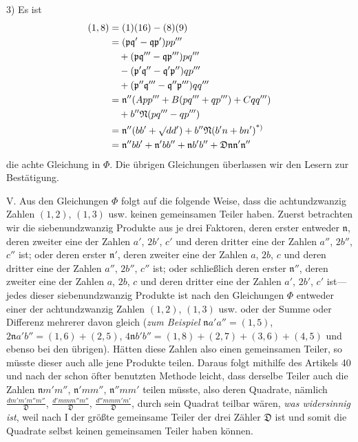 3) Es ist
\[
\begin{aligned}
(1,8)&=(1)(16)-(8)(9)\\
&=(\mathfrak{p}\mathfrak{q}'-\mathfrak{q}\mathfrak{p}')pp'''\\&\quad+(\mathfrak{p}\mathfrak{q}'''-\mathfrak{q}\mathfrak{p}''')pq'''\\&\quad-(\mathfrak{p}'\mathfrak{q}''-\mathfrak{q}'\mathfrak{p}'')qp'''\\&\quad+(\mathfrak{p}''\mathfrak{q}'''-\mathfrak{q}''\mathfrak{p}''')qq'''\\
&=\mathfrak{n}''(App'''+B(pq'''+qp''')+Cqq''')\\&\quad+b''\mathfrak{N}(pq'''-qp''')\\
&=\mathfrak{n}''(bb'+\surd dd')+b''\mathfrak{N}(b'n+bn')\text{\textsuperscript{*)}}\\
&=\mathfrak{n}''bb'+\mathfrak{n}'bb''+\mathfrak{n}b'b''+\mathfrak{D}\mathfrak{n}\mathfrak{n}'\mathfrak{n}''
\end{aligned}
\]
die achte Gleichung in $\Phi$. Die übrigen Gleichungen überlassen wir den Lesern zur Bestätigung.

V. Aus den Gleichungen $\Phi$ folgt auf die folgende Weise, dass die achtundzwanzig Zahlen $(1,2)$, $(1,3)$ usw. keinen gemeinsamen Teiler haben. Zuerst betrachten wir die siebenundzwanzig Produkte aus je drei Faktoren, deren erster entweder $\mathfrak{n}$, deren zweiter eine der Zahlen $a'$, $2b'$, $c'$ und deren dritter eine der Zahlen $a''$, $2b''$, $c''$ ist; oder deren erster $\mathfrak{n}'$, deren zweiter eine der Zahlen $a$, $2b$, $c$ und deren dritter eine der Zahlen $a''$, $2b''$, $c''$ ist; oder schließlich deren erster $\mathfrak{n}''$, deren zweiter eine der Zahlen $a$, $2b$, $c$ und deren dritter eine der Zahlen $a'$, $2b'$, $c'$ ist---jedes dieser siebenundzwanzig Produkte ist nach den Gleichungen $\Phi$ entweder einer der achtundzwanzig Zahlen $(1,2)$, $(1,3)$ usw. oder der Summe oder Differenz mehrerer davon gleich (\textit{zum Beispiel} $\mathfrak{n}a'a''=(1,5)$, $2\mathfrak{n}a'b''=(1,6)+(2,5)$, $4\mathfrak{n}b'b''=(1,8)+(2,7)+(3,6)+(4,5)$ und ebenso bei den übrigen). Hätten diese Zahlen also einen gemeinsamen Teiler, so müsste dieser auch alle jene Produkte teilen. Daraus folgt mithilfe des Artikels 40 und nach der schon öfter benutzten Methode leicht, dass derselbe Teiler auch die Zahlen $\mathfrak{n}m'm''$, $\mathfrak{n}'mm''$, $\mathfrak{n}''mm'$ teilen müsste, also deren
Quadrate, nämlich $\frac{dm'm'm''m''}{\mathfrak{D}}$, $\frac{d'mmm''m''}{\mathfrak{D}}$, $\frac{d''mmm'm'}{\mathfrak{D}}$, durch sein Quadrat teilbar wären, \textit{was widersinnig ist}, weil nach I der größte gemeinsame Teiler der drei Zähler $\mathfrak{D}$ ist und somit die Quadrate selbst keinen gemeinsamen Teiler haben können.

